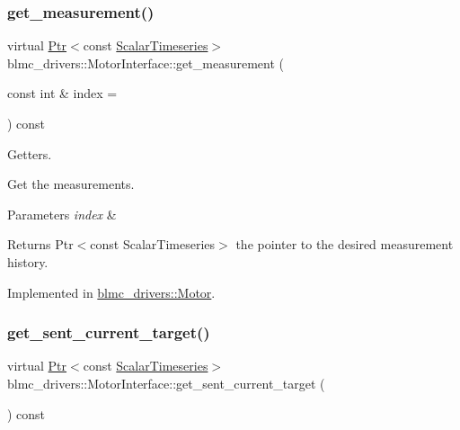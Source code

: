 \subsubsection{\texorpdfstring{get\+\_\+measurement()}{get\_measurement()}}
{\footnotesize\ttfamily virtual \hyperlink{classblmc__drivers_1_1MotorInterface_ae31f230b9da3674a05543023c90b124c}{Ptr}$<$const \hyperlink{classblmc__drivers_1_1MotorInterface_a49b8fc916b9f9debbd7b0988463db5cd}{Scalar\+Timeseries}$>$ blmc\+\_\+drivers\+::\+Motor\+Interface\+::get\+\_\+measurement (\begin{DoxyParamCaption}\item[{const int \&}]{index = {} }\end{DoxyParamCaption}) const\hspace{0.3cm}{\ttfamily [pure virtual]}}



Getters. 

Get the measurements.


\begin{DoxyParams}{Parameters}
{\em index} & \\
\hline
\end{DoxyParams}
\begin{DoxyReturn}{Returns}
Ptr$<$const Scalar\+Timeseries$>$ the pointer to the desired measurement history. 
\end{DoxyReturn}


Implemented in \hyperlink{classblmc__drivers_1_1Motor_a0ff1a1b5eb5da4791cc27879e761eb22}{blmc\+\_\+drivers\+::\+Motor}.

\mbox{\label{classblmc__drivers_1_1MotorInterface_a709804e11aa22fbb3107e781c9799bdb}} 
\subsubsection{\texorpdfstring{get\+\_\+sent\+\_\+current\+\_\+target()}{get\_sent\_current\_target()}}
{\footnotesize\ttfamily virtual \hyperlink{classblmc__drivers_1_1MotorInterface_ae31f230b9da3674a05543023c90b124c}{Ptr}$<$const \hyperlink{classblmc__drivers_1_1MotorInterface_a49b8fc916b9f9debbd7b0988463db5cd}{Scalar\+Timeseries}$>$ blmc\+\_\+drivers\+::\+Motor\+Interface\+::get\+\_\+sent\+\_\+current\+\_\+target (\begin{DoxyParamCaption}{ }\end{DoxyParamCaption}) const\hspace{0.3cm}{\ttfamily [pure virtual]}}



